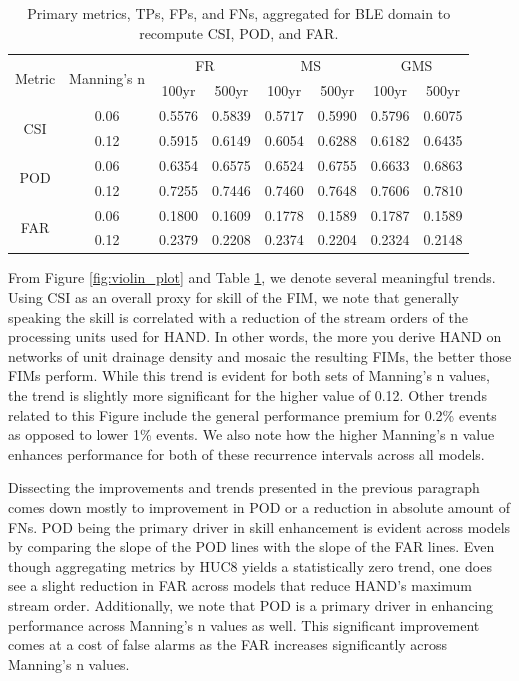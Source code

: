 %
\begin{table}[h!]
\caption{Primary metrics, TPs, FPs, and FNs, aggregated for BLE domain to recompute CSI, POD, and FAR.}
\label{tab:aggregate_metrics}
\centering
\begin{tabular}{|c|c||c|c|c|c|c|c|}
\hline
\multirow{2}{*}{Metric} & \multirow{2}{*}{Manning's n} & \multicolumn{2}{|c|}{FR} & \multicolumn{2}{|c|}{MS} & \multicolumn{2}{|c|}{GMS} \\
\cline{3-8}
  &  & 100yr & 500yr & 100yr & 500yr & 100yr & 500yr \\
\hline
\multirow{2}{*}{CSI} & 0.06 & 0.5576 & 0.5839 & 0.5717 & 0.5990 & 0.5796 & 0.6075 \\
\cline{2-8}
  & 0.12 & 0.5915 & 0.6149 & 0.6054 & 0.6288 & 0.6182 & 0.6435 \\
\hline
\multirow{2}{*}{POD} & 0.06 & 0.6354 & 0.6575 & 0.6524 & 0.6755 & 0.6633 & 0.6863 \\
\cline{2-8}
  & 0.12 & 0.7255 & 0.7446 & 0.7460 & 0.7648 & 0.7606 & 0.7810 \\
\hline
\multirow{2}{*}{FAR} & 0.06 & 0.1800 & 0.1609 & 0.1778 & 0.1589 & 0.1787 & 0.1589 \\
\cline{2-8}
  & 0.12 & 0.2379 & 0.2208 & 0.2374 & 0.2204 & 0.2324 & 0.2148 \\
\hline
\end{tabular}
\end{table}
%
From Figure \ref{fig:violin_plot} and Table \ref{tab:aggregate_metrics}, we denote several meaningful trends. 
Using CSI as an overall proxy for skill of the FIM, we note that generally speaking the skill is correlated with a reduction of the stream orders of the processing units used for HAND.
In other words, the more you derive HAND on networks of unit drainage density and mosaic the resulting FIMs, the better those FIMs perform.
While this trend is evident for both sets of Manning's n values, the trend is slightly more significant for the higher value of 0.12.
Other trends related to this Figure include the general performance premium for 0.2\% events as opposed to lower 1\% events.
We also note how the higher Manning's n value enhances performance for both of these recurrence intervals across all models.

Dissecting the improvements and trends presented in the previous paragraph comes down mostly to improvement in POD or a reduction in absolute amount of FNs.
POD being the primary driver in skill enhancement is evident across models by comparing the slope of the POD lines with the slope of the FAR lines.
Even though aggregating metrics by HUC8 yields a statistically zero trend, one does see a slight reduction in FAR across models that reduce HAND's maximum stream order.
Additionally, we note that POD is a primary driver in enhancing performance across Manning's n values as well.
This significant improvement comes at a cost of false alarms as the FAR increases significantly across Manning's n values.
%
